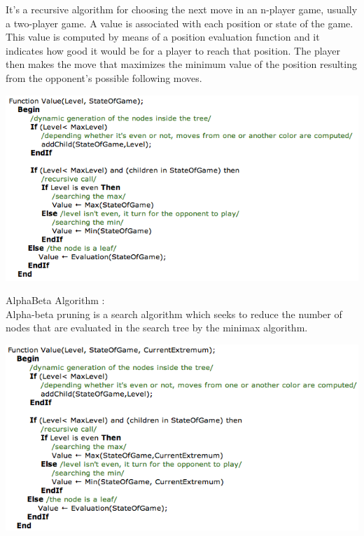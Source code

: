 \documentclass[11pt,a4paper]{report}
\begin{document}
It's a recursive algorithm for choosing the next move in an n-player game, usually a two-player game. A value is associated with each position or state of the game. This value is computed by means of a position evaluation function and it indicates how good it would be for a player to reach that position. The player then makes the move that maximizes the minimum value of the position resulting from the opponent's possible following moves.\\

\begin{center}
\includegraphics[scale=0.60]{images/MinMax.png}
\end{center}

AlphaBeta Algorithm : \\

Alpha-beta pruning is a search algorithm which seeks to reduce the number of nodes that are evaluated in the search tree by the minimax algorithm.

\begin{center}
\includegraphics[scale=0.60]{images/AlphaBeta.png}
\end{center}
\end{document}
